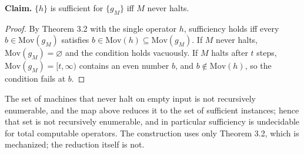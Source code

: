\documentclass[conference]{IEEEtran}
\newcommand{\Mov}{\mathrm{Mov}}
\theoremstyle{run}
\begin{document}
\textbf{Claim.} $\{h\}$ is sufficient for $\{g_M\}$ iff $M$ never halts.

\begin{proof}
By Theorem 3.2 with the single operator $h$, sufficiency holds iff every $b \in \Mov(g_M)$ satisfies $b \in \Mov(h) \subseteq \Mov(g_M)$. If $M$ never halts, $\Mov(g_M) = \varnothing$ and the condition holds vacuously. If $M$ halts after $t$ steps, $\Mov(g_M) = [t, \infty)$ contains an even number $b$, and $b \notin \Mov(h)$, so the condition fails at $b$.
\end{proof}

The set of machines that never halt on empty input is not recursively enumerable, and the map above reduces it to the set of sufficient instances; hence that set is not recursively enumerable, and in particular sufficiency is undecidable for total computable operators. The construction uses only Theorem 3.2, which is mechanized; the reduction itself is not.


\FloatBarrier
\end{document}
